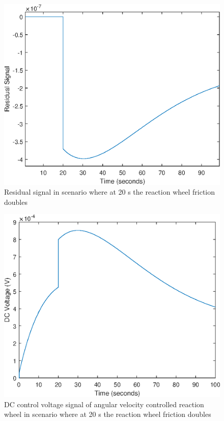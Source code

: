 \begin{figure}
	\centering
	\includegraphics[width=120mm]{figures/residual_Noreconfig}
	\caption{Residual signal in scenario where at 20 s the reaction wheel friction doubles}
	\label{fig:residual}
\end{figure} 

\begin{figure}
	\centering
	\includegraphics[width=120mm]{figures/voltage_Noreconfig}
	\caption{DC control voltage signal of angular velocity controlled reaction wheel in scenario where at 20 s the reaction wheel friction doubles}
	\label{fig:rwFaultRes3}
\end{figure} 

